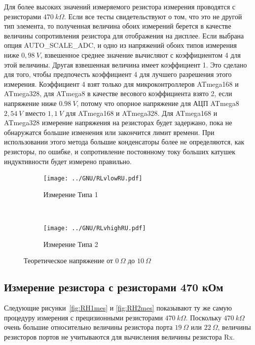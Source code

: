 Для более высоких значений измеряемого резистора измерения  проводятся с резисторами \(470~k\Omega\). Если все 
тесты свидетельствуют о том, что это не другой тип элемента, то полученная величина обоих измерений берется в 
качестве величины сопротивления резистора для отображения на дисплее. Если выбрана опция AUTO\_SCALE\_ADC, и 
одно из напряжений обоих типов измерения ниже \(0,98~V\), взвешенное среднее значение вычисляют с коэффициентом 4 
для этой величины. Другая взвешенная величина имеет коэффициент 1. Это сделано для того, чтобы предпочесть 
коэффициент 4 для лучшего разрешения этого измерения. Коэффициент 4 взят только для микроконтроллеров ATmega168 
и ATmega328, для ATmega8 в качестве весового коэффициента взято 2, если напряжение ниже \(0.98~V\), потому что опорное 
напряжение для АЦП ATmega8 \(2,54~V\) вместо \(1,1~V\) для ATmega168 и ATmega328. Для ATmega168 и ATmega328 измерение 
напряжения на резисторах будет задержано, пока не обнаружатся большие изменения или закончится лимит времени. 
При использовании этого метода большие конденсаторы более не определяются, как резисторы, по ошибке, и 
сопротивление постоянному току больших катушек индуктивности будет измерено правильно.


\begin{figure}[H]
  \begin{subfigure}[b]{.5\textwidth}
    \centering
    \texttt{[image: ../GNU/RLvlowRU.pdf]}
    \caption{Измерение Типа 1}
    \label{fig:RLvlow}
  \end{subfigure}
  ~
  \begin{subfigure}[b]{.5\textwidth}
    \centering
    \texttt{[image: ../GNU/RLvhighRU.pdf]}
    \caption{Измерение Типа 2}
    \label{fig:RLvhigh}
  \end{subfigure}
  \caption{Теоретическое напряжение от \(0~\Omega\) до \(10~\Omega\)}
\end{figure}


\subsection{Измерение резистора с резисторами 470 кОм}
Следующие рисунки~\ref{fig:RH1mes} и \ref{fig:RH2mes} показывают ту же самую процедуру измерения с прецизионными 
резисторами \(470~k\Omega\). Поскольку \(470~k\Omega\) очень большие относительно величины резистора 
порта \(19~\Omega\) или \(22~\Omega\), величины резисторов портов не учитываются для вычисления величины резистора Rx.


